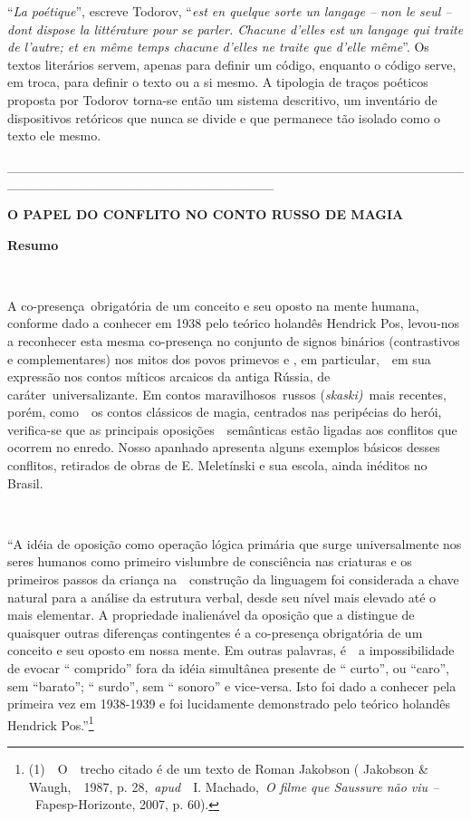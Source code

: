 ``\emph{La poétique}'', escreve Todorov, ``\emph{est en quelque sorte un
langage -- non le seul -- dont dispose la littérature pour se parler.
Chacune d'elles est un langage qui traite de l'autre; et en même temps
chacune d'elles ne traite que d'elle même}''. Os textos literários
servem, apenas para definir um código, enquanto o código serve, em
troca, para definir o texto ou a si mesmo. A tipologia de traços
poéticos proposta por Todorov torna-se então um sistema descritivo, um
inventário de dispositivos retóricos que nunca se divide e que permanece
tão isolado como o texto ele mesmo.

\_\_\_\_\_\_\_\_\_\_\_\_\_\_\_\_\_\_\_\_\_\_\_\_\_\_\_\_\_\_\_\_\_\_\_\_\_\_\_\_\_\_\_\_\_\_\_\_\_\_\_\_\_\_\_\_\_\_\_\_\_\_\_\_\_\_\_\_\_\_\_\_\_\_\_\_

\textbf{O PAPEL DO CONFLITO NO CONTO RUSSO DE MAGIA}

\textbf{Resumo}

\textbf{~}

A co-presença~obrigatória de um conceito e seu oposto na mente humana,
conforme dado a conhecer em 1938 pelo teórico holandês Hendrick Pos,
levou-nos a reconhecer esta mesma co-presença no conjunto de signos
binários (contrastivos e complementares) nos mitos dos povos primevos e
, em particular,~~em sua expressão nos contos míticos arcaicos da antiga
Rússia, de caráter~universalizante. Em contos maravilhosos~russos
(\emph{skaski)~}mais recentes, porém, como~~os contos clássicos de
magia, centrados nas peripécias do herói, verifica-se que as principais
oposições~~semânticas estão ligadas aos conflitos que ocorrem no enredo.
Nosso apanhado apresenta alguns exemplos básicos desses conflitos,
retirados de obras de E. Meletínski e sua escola, ainda inéditos no
Brasil.

\textbf{~}

``A idéia de oposição como operação lógica primária que surge
universalmente nos seres humanos como primeiro vislumbre de consciência
nas criaturas e os primeiros passos da criança na~~construção da
linguagem foi considerada a chave natural para a análise da estrutura
verbal, desde seu nível mais elevado até o mais elementar. A propriedade
inalienável da oposição que a distingue de quaisquer outras diferenças
contingentes é a co-presença obrigatória de um conceito e seu oposto em
nossa mente. Em outras palavras, é~~a impossibilidade de evocar ``
comprido'' fora da idéia simultânea presente de `` curto'', ou ``caro'',
sem ``barato''; `` surdo'', sem `` sonoro'' e vice-versa. Isto foi dado
a conhecer pela primeira vez em 1938-1939 e foi lucidamente demonstrado
pelo teórico holandês Hendrick Pos.''\footnote{(1)~~O~~trecho citado é
  de um texto de Roman Jakobson ( Jakobson \& Waugh,~~1987, p.
  28,~\emph{apud}~~I. Machado,~\emph{O filme que Saussure não viu
  --~}Fapesp-Horizonte, 2007, p. 60).}

